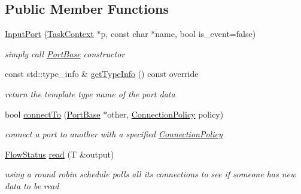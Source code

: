 \subsection*{Public Member Functions}
\begin{DoxyCompactItemize}
\item 
\hypertarget{classcoco_1_1_input_port_afd669935d7d07633289f78c0453de595}{\hyperlink{classcoco_1_1_input_port_afd669935d7d07633289f78c0453de595}{Input\-Port} (\hyperlink{classcoco_1_1_task_context}{Task\-Context} $\ast$p, const char $\ast$name, bool is\-\_\-event=false)}\label{classcoco_1_1_input_port_afd669935d7d07633289f78c0453de595}

\begin{DoxyCompactList}\small\item\em simply call \hyperlink{classcoco_1_1_port_base}{Port\-Base} constructor \end{DoxyCompactList}\item 
\hypertarget{classcoco_1_1_input_port_a6b0d4b4de9199a102168c767756d0000}{const std\-::type\-\_\-info \& \hyperlink{classcoco_1_1_input_port_a6b0d4b4de9199a102168c767756d0000}{get\-Type\-Info} () const override}\label{classcoco_1_1_input_port_a6b0d4b4de9199a102168c767756d0000}

\begin{DoxyCompactList}\small\item\em return the template type name of the port data \end{DoxyCompactList}\item 
\hypertarget{classcoco_1_1_input_port_a838df83833fa100b992eb96c5cc01536}{bool \hyperlink{classcoco_1_1_input_port_a838df83833fa100b992eb96c5cc01536}{connect\-To} (\hyperlink{classcoco_1_1_port_base}{Port\-Base} $\ast$other, \hyperlink{structcoco_1_1_connection_policy}{Connection\-Policy} policy)}\label{classcoco_1_1_input_port_a838df83833fa100b992eb96c5cc01536}

\begin{DoxyCompactList}\small\item\em connect a port to another with a specified \hyperlink{structcoco_1_1_connection_policy}{Connection\-Policy} \end{DoxyCompactList}\item 
\hypertarget{classcoco_1_1_input_port_a92e1dd40c0f20d207c7098ba9699c89f}{\hyperlink{namespacecoco_a057be58377e415c9be98c1dc5c8426ad}{Flow\-Status} \hyperlink{classcoco_1_1_input_port_a92e1dd40c0f20d207c7098ba9699c89f}{read} (T \&output)}\label{classcoco_1_1_input_port_a92e1dd40c0f20d207c7098ba9699c89f}

\begin{DoxyCompactList}\small\item\em using a round robin schedule polls all its connections to see if someone has new data to be read \end{DoxyCompactList}\end{DoxyCompactItemize}
